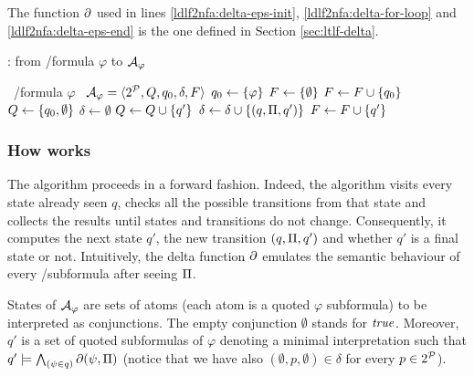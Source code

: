 The function $\partial$ used in lines \ref{ldlf2nfa:delta-eps-init}, \ref{ldlf2nfa:delta-for-loop} and \ref{ldlf2nfa:delta-eps-end} is the one defined in Section \ref{sec:ltlf-delta}.
\begin{algorithm}
	\caption{\LTLfToNFA: from \LTLf/\PLTL formula $\varphi$ to \NFA $\mathcal{A}_\varphi$}
	\label{alg:ltl2nfa}
	\begin{algorithmic}[1]
		\State \algInput\ \LTLf/\PLTL formula $\varphi$
		\State \algOutput\ \NFA $\mathcal{A}_\varphi = \langle 2^{\mathcal{P}}, Q, q_0, \delta, F \rangle$
		\State $q_0 \gets \{\varphi\}$
		\State $F \gets \{\emptyset\}$
		\If{$(\DfunEps{\varphi} = \true)$} \label{ldlf2nfa:delta-eps-init}
			\State $F \gets F \cup \{q_0\}$
		\EndIf
		\State $Q \gets \{q_0, \emptyset\}$
		\State $\delta \gets \emptyset$
			 \label{ldlf2nfa:main-for-loop}
				 \label{ldlf2nfa:delta-for-loop}
					\State $Q \gets Q \cup \{q'\}$
					\State $\delta \gets \delta \cup \{(q, \Pi, q')\}$
					 \label{ldlf2nfa:delta-eps-end}
						\State $F \gets F \cup \{q'\}$
					\EndIf
				\EndIf		
			\EndFor
		\EndWhile
	\end{algorithmic}
\end{algorithm}

\subsubsection*{How \LTLfToNFA works}
The \LTLfToNFA algorithm proceeds in a forward fashion. Indeed, the algorithm visits every state already seen $q$, checks all the possible transitions from that state and collects the results until states and transitions do not change. Consequently, it computes the next state $q'$, the new transition $(q, \Pi, q')$ and whether $q'$ is a final state or not. Intuitively, the delta function $\partial$ emulates the semantic behaviour of every \LTLf/\PLTL subformula after seeing $\Pi$.

States of $\mathcal{A}_\varphi$ are sets of atoms (each atom is a quoted $\varphi$ subformula) to be interpreted as conjunctions. The empty conjunction $\emptyset$ stands for $\mathit{true}$. Moreover, $q'$ is a set of quoted subformulas of $\varphi$ denoting a minimal interpretation such that $q' \models \bigwedge_{(\psi\in q)} \partial\lparen \psi,\Pi \rparen$ (notice that we have also $(\emptyset, p,\emptyset) \in \delta$ for every $p \in 2^{\mathcal{P}}$).

